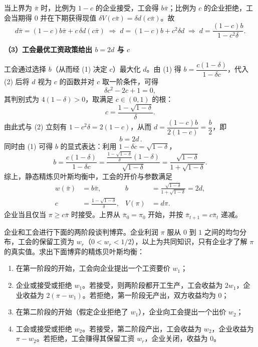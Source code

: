 当上界为 $\bar\pi$ 时，比例为 $1-c$ 的企业接受，工会得 $b\bar\pi$；比例为 $c$ 的企业拒绝，工会当期得 $0$ 并在下期获得现值 $\delta V(c\bar\pi)=\delta d(c\bar\pi)$。故
\[
  d\bar\pi=(1-c)b\bar\pi+c\,\delta d(c\bar\pi)
  \;\Longrightarrow\;
  d=(1-c)b+c^2\delta d
  \;\Longrightarrow\;
  d=\frac{(1-c)b}{1-c^2\delta}. \tag{2}
\]

\textbf{（3）工会最优工资政策给出 $b=2d$ 与 $c$}

工会通过选择 $b$（从而经 (1) 决定 $c$）最大化 $d$。由 (1) 得 $b=\dfrac{c(1-\delta)}{1-\delta c}$，代入 (2) 后将 $d$ 视为 $c$ 的函数并对 $c$ 取一阶条件，可得
\[
  \delta c^2-2c+1=0,
\]\indent
其判别式为 $4(1-\delta)>0$，取满足 $c\in(0,1)$ 的根：
\[
  c=\frac{1-\sqrt{1-\delta}}{\delta}.
\]\indent
由此式与 (2) 立刻有 $1-c^2\delta=2(1-c)$，从而 $d=\dfrac{(1-c)b}{2(1-c)}=\dfrac{b}{2}$，即
\[
  \boxed{\,b=2d\,}.
\]\indent
同时由 (1) 可得 $b$ 的显式表达：利用 $1-\delta c=\sqrt{1-\delta}$，
\[
  b=\frac{c(1-\delta)}{1-\delta c}
    =\frac{\frac{1-\sqrt{1-\delta}}{\delta}(1-\delta)}{\sqrt{1-\delta}}
    =\frac{\sqrt{1-\delta}}{1+\sqrt{1-\delta}}.
\]\indent
综上，静态精炼贝叶斯均衡中，工会的开价与参数满足
\begin{align*}
  w(\bar\pi)&=b\bar\pi,
  &b&=\frac{\sqrt{1-\delta}}{1+\sqrt{1-\delta}}=2d,\\
  c&=\frac{1-\sqrt{1-\delta}}{\delta},
  &V(\pi)&=d\pi.
\end{align*}\indent
企业当且仅当 $\pi\ge c\bar\pi$ 时接受。上界从 $\bar\pi_0=\pi_0$ 开始，并按 $\bar\pi_{t+1}=c\bar\pi_t$ 递减。

企业和工会进行下面的两阶段谈判博弈。企业利润 $\pi$ 服从 $0$ 到 $1$ 之间的均匀分布，工会的保留工资为 $w_r$（$0<w_r<1/2$），以上为共同知识，只有企业才了解 $\pi$ 的真实值。求出下面博弈的精炼贝叶斯均衡：
\begin{enumerate}[leftmargin=1.6em, label=(\arabic*)]
  \item 在第一阶段的开始，工会向企业提出一个工资要价 $w_1$；
  \item 企业或接受或拒绝 $w_1$。若接受，则两阶段都开工生产，工会收益为 $2w_1$，企业收益为 $2(\pi-w_1)$。若拒绝，第一阶段无产出，双方收益均为 $0$；
  \item 在第二阶段的开始（假定企业拒绝了 $w_1$），企业向工会提出一个出价 $w_2$；
  \item 工会或接受或拒绝 $w_2$。若接受，第二阶段产出，工会收益为 $w_2$，企业收益为 $\pi-w_2$。若拒绝，工会赚得其保留工资 $w_r$，企业关闭，收益为 $0$。
\end{enumerate}

